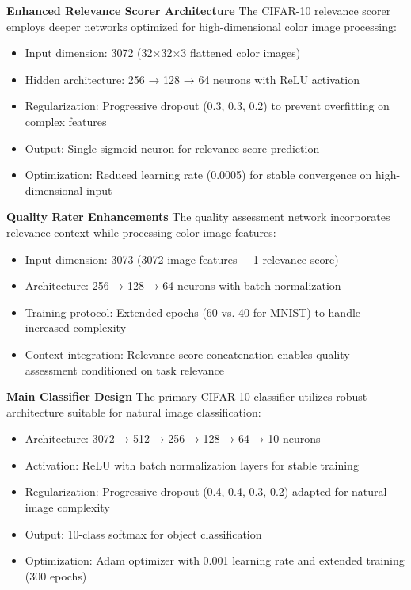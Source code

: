 \documentclass[12pt]{article}
\begin{document}
\textbf{Enhanced Relevance Scorer Architecture}
The CIFAR-10 relevance scorer employs deeper networks optimized for high-dimensional color image processing:

\begin{itemize}
\item Input dimension: 3072 (32×32×3 flattened color images)
\item Hidden architecture: 256 → 128 → 64 neurons with ReLU activation
\item Regularization: Progressive dropout (0.3, 0.3, 0.2) to prevent overfitting on complex features
\item Output: Single sigmoid neuron for relevance score prediction
\item Optimization: Reduced learning rate (0.0005) for stable convergence on high-dimensional input
\end{itemize}

\textbf{Quality Rater Enhancements}
The quality assessment network incorporates relevance context while processing color image features:

\begin{itemize}
\item Input dimension: 3073 (3072 image features + 1 relevance score)
\item Architecture: 256 → 128 → 64 neurons with batch normalization
\item Training protocol: Extended epochs (60 vs. 40 for MNIST) to handle increased complexity
\item Context integration: Relevance score concatenation enables quality assessment conditioned on task relevance
\end{itemize}

\textbf{Main Classifier Design}
The primary CIFAR-10 classifier utilizes robust architecture suitable for natural image classification:

\begin{itemize}
\item Architecture: 3072 → 512 → 256 → 128 → 64 → 10 neurons
\item Activation: ReLU with batch normalization layers for stable training
\item Regularization: Progressive dropout (0.4, 0.4, 0.3, 0.2) adapted for natural image complexity
\item Output: 10-class softmax for object classification
\item Optimization: Adam optimizer with 0.001 learning rate and extended training (300 epochs)
\end{itemize}
\end{document}
